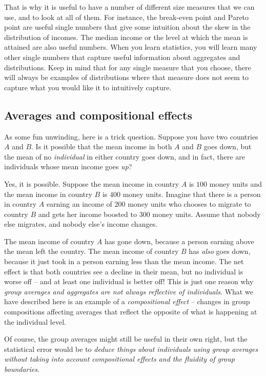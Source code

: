 \documentclass{amsart}
\begin{document}
That is why it is useful to have a number of different size measures
that we can use, and to look at all of them. For instance, the
break-even point and Pareto point are useful single numbers that give
some intuition about the skew in the distribution of incomes. The
median income or the level at which the mean is attained are also
useful numbers. When you learn statistics, you will learn many other
single numbers that capture useful information about aggregates and
distributions. Keep in mind that for any single measure that you
choose, there will always be examples of distributions where that
measure does not seem to capture what you would like it to intuitively
capture.

\subsection{Averages and compositional effects}

As some fun unwinding, here is a trick question. Suppose you have two
countries $A$ and $B$. Is it possible that the mean income in both $A$
and $B$ goes down, but the mean of no {\em individual} in either
country goes down, and in fact, there are individuals whose mean
income goes {\em up}?

Yes, it is possible. Suppose the mean income in country $A$ is $100$
money units and the mean income in country $B$ is $400$ money
units. Imagine that there is a person in country $A$ earning an income
of $200$ money units who chooses to migrate to country $B$ and gets
her income boosted to $300$ money units. Assume that nobody else
migrates, and nobody else's income changes.

The mean income of country $A$ has gone down, because a person earning
above the mean left the country. The mean income of country $B$ has
{\em also} goes down, because it just took in a person earning less
than the mean income. The net effect is that both countries see a
decline in their mean, but no individual is worse off -- and at least
one individual is better off! This is just one reason why {\em group
averages and aggregates are not always reflective of
individuals}. What we have described here is an example of a {\em
compositional effect} -- changes in group compositions affecting
averages that reflect the opposite of what is happening at the
individual level.

Of course, the group averages might still be useful in their own
right, but the statistical error would be to {\em deduce things about
individuals using group averages without taking into account
compositional effects and the fluidity of group boundaries}.
\end{document}
